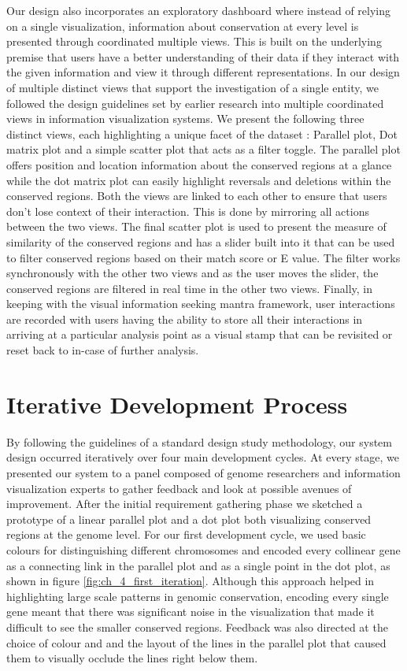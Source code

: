 Our design also incorporates an exploratory dashboard where instead of relying on a single visualization, information about conservation at every level is presented through coordinated multiple views. This is built on the underlying premise that users have a better understanding of their data if they interact with the given information and view it through different representations\cite{Roberts}. In our design of multiple distinct views that support the investigation of a single entity, we followed the design guidelines set by earlier research into multiple coordinated views in information visualization systems\cite{WangBaldonado}. We present the following three distinct views, each highlighting a unique facet of the dataset : Parallel plot, Dot matrix plot and a simple scatter plot that acts as a filter toggle. The parallel plot offers position and location information about the conserved regions at a glance while the dot matrix plot can easily highlight reversals and deletions within the conserved regions. Both the views are linked to each other to ensure that users don't lose context of their interaction. This is done by mirroring all actions between the two views. The final scatter plot is used to present the measure of similarity of the conserved regions and has a slider built into it that can be used to filter conserved regions based on their match score or E value. The filter works synchronously with the other two views and as the user moves the slider, the conserved regions are filtered in real time in the other two views. Finally, in keeping with the visual information seeking mantra framework, user interactions are recorded with users having the ability to store all their interactions in arriving at a particular analysis point as a visual stamp that can be revisited or reset back to in-case of further analysis.

\section{Iterative Development Process}
By following the guidelines of a standard design study methodology\cite{5290695}, our system design occurred iteratively over four main development cycles. At every stage, we presented our system to a panel composed of genome researchers and information visualization experts to gather feedback and look at possible avenues of improvement. After the initial requirement gathering phase we sketched a prototype of a linear parallel plot and a dot plot both visualizing conserved regions at the genome level. For our first development cycle, we used basic colours for distinguishing different chromosomes and encoded every collinear gene as a connecting link in the parallel plot and as a single point in the dot plot, as shown in figure \ref{fig:ch_4_first_iteration}. Although this approach helped in highlighting large scale patterns in genomic conservation, encoding every single gene meant that there was significant noise in the visualization that made it difficult to see the smaller conserved regions. Feedback was also directed at the choice of colour and and the layout of the lines in the parallel plot that caused them to visually occlude the lines right below them.

